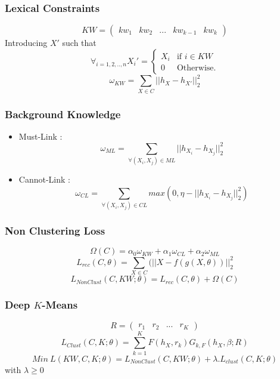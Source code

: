 \documentclass{beamer}
\begin{document}
\begin{frame}
\frametitle{Lexical Constraints}
\begin{equation*}
KW = \begin{pmatrix} kw_1 & kw_2 & ... & kw_{k-1} & kw_{k}
\end {pmatrix}
\end{equation*}
\pause
Introducing $X'$ such that
\begin{equation*}
\forall_{i=1,2,..,n}X_i' = \left\{
\begin{array}{ll}
  X_i & \mbox{if } i \in KW \\
  0 & \mbox{Otherwise.}
\end{array}
\right.
\end{equation*}
\pause
\begin{equation*}\label{eq:omega1}
  \omega_{KW} = \sum_{X \in C} || h_{X} - h_{X'}||_2^2
\end{equation*}
\end{frame}

\begin{frame}
\frametitle{Background Knowledge}
\pause
\begin{itemize}
\item Must-Link : $$\omega_{ML} = \sum_{\forall{(X_i,X_j)\in ML}} || h_{X_i} - h_{X_j} ||_2^2$$ \pause
\item Cannot-Link : $$\omega_{CL} = \sum_{\forall{(X_i,X_j)\in CL}} max(0,
  \eta - || h_{X_i} - h_{X_j} ||_2^2)$$
\end{itemize}
\end{frame}

\begin{frame}
\frametitle{Non Clustering Loss}
\begin{equation*}\label{eq:Sparse}
  \Omega(C) = \alpha_0\omega_{KW} + \alpha_1\omega_{CL} + \alpha_2\omega_{ML}  
\end{equation*}
\pause
\begin{equation*}
  L_{rec}(C, \theta) = \sum_{X \in C}(||X - f(g(X, \theta))||_2^2
\end{equation*}
\pause
\begin{equation*}
  L_{NonClust}(C,KW; \theta) = L_{rec}(C, \theta) + \Omega(C)  
\end{equation*}

\end{frame}

\begin{frame}
\frametitle{Deep $K$-Means}
$$R = \begin{pmatrix} r_1 & r_2 & ... & r_K\end{pmatrix}$$
\pause
\begin{equation*}
  L_{Clust}(C, K; \theta) = \sum_{k=1}^K F(h_X, r_k) G_{k, F}(h_X, \beta; R) 
\end{equation*}
\pause
\begin{equation*}
  Min~L(KW, C, K; \theta) = L_{NonClust}(C, KW; \theta) + \lambda.L_{clust}(C,K;\theta)
\end{equation*}
with $\lambda \geq 0$
\end{frame}
\end{document}
